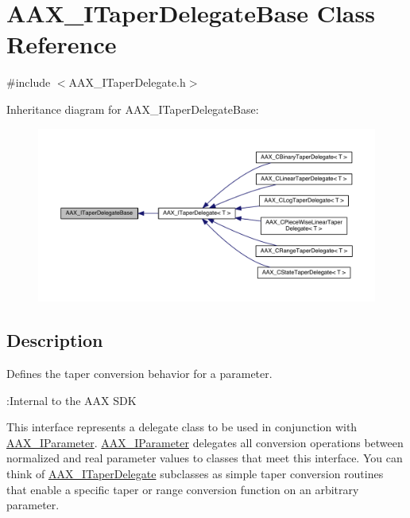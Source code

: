 \hypertarget{a00115}{}\section{A\+A\+X\+\_\+\+I\+Taper\+Delegate\+Base Class Reference}
\label{a00115}


{\ttfamily \#include $<$A\+A\+X\+\_\+\+I\+Taper\+Delegate.\+h$>$}



Inheritance diagram for A\+A\+X\+\_\+\+I\+Taper\+Delegate\+Base\+:
\nopagebreak
\begin{figure}[H]
\begin{center}
\leavevmode
\includegraphics[width=350pt]{a00664}
\end{center}
\end{figure}


\subsection{Description}
Defines the taper conversion behavior for a parameter. 

\begin{DoxyRefDesc}{\+:\+Internal to the A\+A\+X S\+D\+K}
\item[\hyperlink{a00006__aax_sdk_internal000003}{\+:\+Internal to the A\+A\+X S\+D\+K}]\end{DoxyRefDesc}


This interface represents a delegate class to be used in conjunction with \hyperlink{a00108}{A\+A\+X\+\_\+\+I\+Parameter}. \hyperlink{a00108}{A\+A\+X\+\_\+\+I\+Parameter} delegates all conversion operations between normalized and real parameter values to classes that meet this interface. You can think of \hyperlink{a00114}{A\+A\+X\+\_\+\+I\+Taper\+Delegate} subclasses as simple taper conversion routines that enable a specific taper or range conversion function on an arbitrary parameter.

